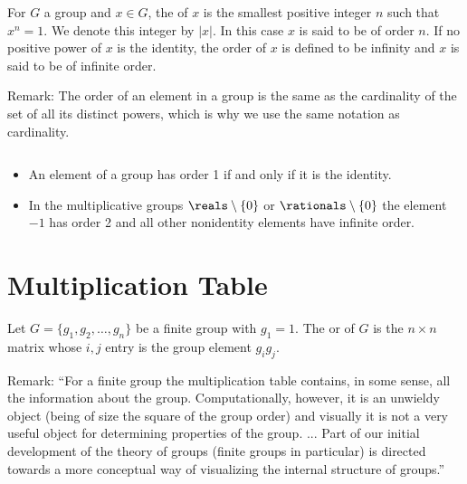 \begin{definition}
	For $G$ a group and $x \in G$, the  of $x$ is the 
	smallest positive integer $n$ such that $x^n = 1$. We denote 
	this integer by $|x|$. In this case $x$ is said to be of order 
	$n$. If no positive power of $x$ is the identity, the order of 
	$x$ is defined to be infinity and $x$ is said to be of infinite 
	order.
\end{definition}

Remark: The order of an element in a group is the same as the 
cardinality of the set of all its distinct powers, which is why we 
use the same notation as cardinality.

\begin{example}
	$ $
	\begin{itemize}
		\item An element of a group has order 1 if and only if it 
		is the identity.
		
		\item In the multiplicative groups $\reals \setminus \{ 0 
		\}$ or $\rationals \setminus \{ 0 \}$ the element $-1$ has 
		order 2 and all other nonidentity elements have infinite 
		order.
	\end{itemize}
\end{example}


\newpage

\section{Multiplication Table}

\begin{definition}
	Let $G = \{ g_1, g_2, \dots, g_n \}$ be a finite group with 
	$g_1 = 1$. The  or  of 
	$G$ is the $n \times n$ matrix whose $i, j$ entry is the group 
	element $g_ig_j$.
\end{definition}

Remark: ``For a finite group the multiplication table contains, in 
some sense, all the information about the group. Computationally, 
however, it is an unwieldy object (being of size the square of the 
group order) and visually it is not a very useful object for 
determining properties of the group. ... Part of our initial 
development of the theory of groups (finite groups in particular) 
is directed towards a more conceptual way of visualizing the 
internal structure of groups.''

